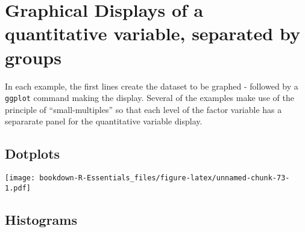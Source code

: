\documentclass[]{book}
\newenvironment{Shaded}{\begin{snugshade}}{\end{snugshade}}
\newcommand{\KeywordTok}[1]{\textcolor[rgb]{0.13,0.29,0.53}{\textbf{#1}}}
\newcommand{\DataTypeTok}[1]{\textcolor[rgb]{0.13,0.29,0.53}{#1}}
\newcommand{\DecValTok}[1]{\textcolor[rgb]{0.00,0.00,0.81}{#1}}
\newcommand{\StringTok}[1]{\textcolor[rgb]{0.31,0.60,0.02}{#1}}
\newcommand{\CommentTok}[1]{\textcolor[rgb]{0.56,0.35,0.01}{\textit{#1}}}
\newcommand{\OperatorTok}[1]{\textcolor[rgb]{0.81,0.36,0.00}{\textbf{#1}}}
\newcommand{\NormalTok}[1]{#1}
\begin{document}
\section{Graphical Displays of a quantitative variable, separated by
groups}\label{graphical-displays-of-a-quantitative-variable-separated-by-groups}

In each example, the first lines create the dataset to be graphed -
followed by a \texttt{ggplot} command making the display. Several of the
examples make use of the principle of ``small-multiples'' so that each
level of the factor variable has a separarate panel for the quantitative
variable display.

\subsection{Dotplots}\label{dotplots}

\begin{Shaded}
\end{Shaded}

\texttt{[image: bookdown-R-Essentials\_files/figure-latex/unnamed-chunk-73-1.pdf]}

\subsection{Histograms}\label{histograms}
\end{document}
